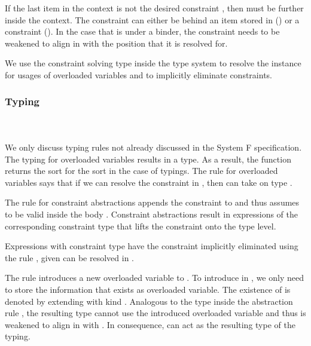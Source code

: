 \noindent If the last item in the context is not the desired constraint , then  must be further inside the context. The constraint can either be behind an item stored in  () or a constraint (). In the case that  is under a binder, the constraint needs to be weakened to align in  with the position that it is resolved for.

\noindent We use the constraint solving type inside the type system to resolve the instance for usages of overloaded variables and to implicitly eliminate constraints.

\subsubsection{Typing}\hfill\\\\
We only discuss typing rules not already discussed in the System F specification. The typing for overloaded variables results in a type. As a result, the  function returns the sort  for the sort  in the case of typings.
\FoTyping
The rule for overloaded variables  says that if we can resolve the constraint  \Constr{:}  in , then  can take on type . 

\noindent The rule for constraint abstractions  appends the constraint  to  and thus assumes  to be valid inside the body . Constraint abstractions result in expressions of the corresponding constraint type \Constr{[}  \Constr{]⇒}  that lifts the constraint onto the type level.

\noindent Expressions  with constraint type \Constr{[}  \Constr{]⇒}  have the constraint implicitly eliminated using the rule , given  can be resolved in .

\noindent The rule  introduces a new overloaded variable  to . 
To introduce  in , we only need to store the information that  exists as overloaded variable. The existence of  is denoted by extending  with kind .
Analogous to the type  inside the abstraction rule , the resulting type  cannot use the introduced overloaded variable and thus is weakened to align in  with   . In consequence,  can act as the resulting type of the typing.

